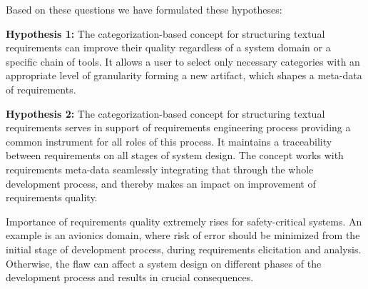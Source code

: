 Based on these questions we have formulated these hypotheses:

\textbf{Hypothesis 1:} The categorization-based concept for structuring textual requirements can improve their quality regardless of a system domain or a specific chain of tools. It allows a user to select only necessary categories with an appropriate level of granularity forming a new artifact, which shapes a meta-data of requirements.

\textbf{Hypothesis 2:} The categorization-based concept for structuring textual requirements serves in support of requirements engineering process providing a common instrument for all roles of this process. It maintains a traceability between requirements on all stages of system design. The concept works with requirements meta-data seamlessly integrating that through the whole development process, and thereby makes an impact on improvement of requirements quality.

Importance of requirements quality extremely rises for safety-critical systems. An example is an avionics domain, where risk of error should be minimized from the initial stage of development process, during requirements elicitation and analysis. Otherwise, the flaw can affect a system design on different phases of the development process and results in crucial consequences.






